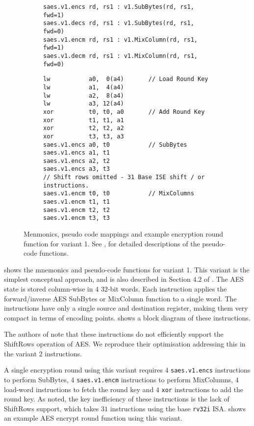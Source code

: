 
\begin{figure}
\begin{subfigure}{\textwidth}
\begin{lstlisting}[language=pseudo,style=block]
saes.v1.encs rd, rs1 : v1.SubBytes(rd, rs1, fwd=1)
saes.v1.decs rd, rs1 : v1.SubBytes(rd, rs1, fwd=0)
saes.v1.encm rd, rs1 : v1.MixColumn(rd, rs1, fwd=1)
saes.v1.decm rd, rs1 : v1.MixColumn(rd, rs1, fwd=0)
\end{lstlisting}
\caption{
}
\label{fig:mnemonics:v1}
\end{subfigure}
\begin{subfigure}{\textwidth}
\begin{lstlisting}[language=pseudo,style=block]
lw           a0,  0(a4)       // Load Round Key
lw           a1,  4(a4)
lw           a2,  8(a4)
lw           a3, 12(a4)
xor          t0, t0, a0       // Add Round Key
xor          t1, t1, a1
xor          t2, t2, a2
xor          t3, t3, a3
saes.v1.encs a0, t0           // SubBytes
saes.v1.encs a1, t1
saes.v1.encs a2, t2
saes.v1.encs a3, t3
// Shift rows omitted - 31 Base ISE shift / or instructions.
saes.v1.encm t0, t0           // MixColumns
saes.v1.encm t1, t1
saes.v1.encm t2, t2
saes.v1.encm t3, t3
\end{lstlisting}
\caption{
}
\label{fig:round:v1}
\end{subfigure}
\caption{
    Menmonics, pseudo code mappings and example encryption
    round function for variant 1.
    See ,  for detailed
    descriptions of the pseudo-code functions.
}
\end{figure}


 shows the mnemonics and pseudo-code functions
for variant 1.
This variant is the simplest conceptual approach, and
is also described in Section $4.2$ of \cite{TilGro:06}.
The AES state is stored column-wise in $4$ $32$-bit words.
Each instruction applies the forward/inverse AES SubBytes or
MixColumn function to a single word.
The instructions have only a single source and destination register,
making them very compact in terms of encoding points.
 shows a block diagram of these
instructions.

The authors of \cite{TilGro:06} note that these instructions do not
efficiently support the ShiftRows operation of AES.  We reproduce their
optimisation addressing this in the variant $2$ instructions.

A single encryption round using this variant requires
$4$ {\tt saes.v1.encs} instructions to perform SubBytes,
$4$ {\tt saes.v1.encm} instructions to perform MixColumns,
$4$ load-word instructions to fetch the round key
and
$4$ {\tt xor} instructions to add the round key.
As noted, the key inefficiency of these instructions is the
lack of ShiftRows support, which takes $31$ instructions using the
base {\tt rv32i} ISA.
 shows an example AES encrypt round function
using this variant.

